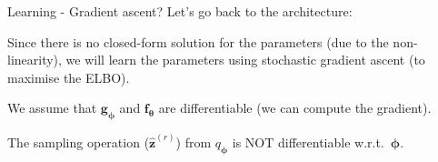 \documentclass[aspectratio=169]{beamer}
\newcommand{\bs}[1]{\boldsymbol{#1}}
\begin{document}
\begin{frame}{Learning - Gradient ascent?}
  Let's go back to the architecture:\vspace{-3mm}
\begin{figure}
  \centering
  \end{figure}\vspace{-3mm}

  Since there is no closed-form solution for the parameters (due to the non-linearity), we will learn the parameters using stochastic gradient ascent (to maximise the ELBO).\vspace{3mm}

  We assume that $\bs{g}_{\bs{\phi}}$ and $\bs{f}_{\bs{\theta}}$ are differentiable (we can compute the gradient).\vspace{3mm}

  The sampling operation ($\hat{\bs{z}}^{(r)}$) from $q_{\bs{\phi}}$ is {\color{red}NOT} differentiable w.r.t.\ $\bs{\phi}$.
\end{frame}
\end{document}
